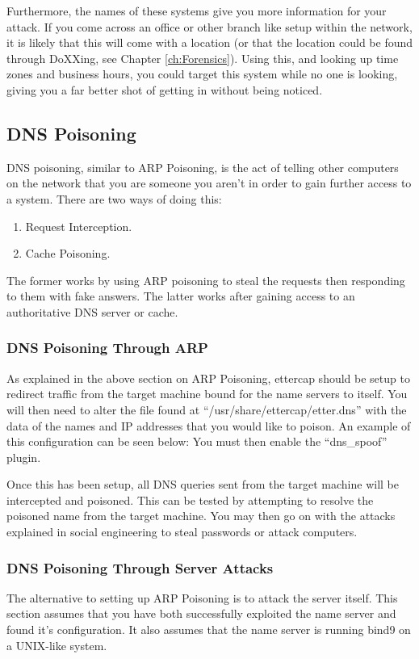 				Furthermore, the names of these systems give you more information for your attack.
				If you come across an office or other branch like setup within the network, it is likely that this will come with a location (or that the location could be found through DoXXing, see Chapter \ref{ch:Forensics}).
				Using this, and looking up time zones and business hours, you could target this system while no one is looking,
				giving you a far better shot of getting in without being noticed.

		\subsection{DNS Poisoning}
			DNS poisoning, similar to ARP Poisoning, is the act of telling other computers on the network that you are someone you aren't in order to gain further access to a system.
			There are two ways of doing this:
			\begin{enumerate}
				\item Request Interception.
				\item Cache Poisoning.
			\end{enumerate}
			The former works by using ARP poisoning to steal the requests then responding to them with fake answers.
			The latter works after gaining access to an authoritative DNS server or cache.

			\subsubsection{DNS Poisoning Through ARP}
				As explained in the above section on ARP Poisoning, ettercap should be setup to redirect traffic from the target machine bound for the name servers to itself.
				You will then need to alter the file found at ``/usr/share/ettercap/etter.dns'' with the data of the names and IP addresses that you would like to poison.
				An example of this configuration can be seen below:
				You must then enable the ``dns\_spoof'' plugin.

				Once this has been setup, all DNS queries sent from the target machine will be intercepted and poisoned.
				This can be tested by attempting to resolve the poisoned name from the target machine.
				You may then go on with the attacks explained in social engineering to steal passwords or attack computers.
			\subsubsection{DNS Poisoning Through Server Attacks}
				The alternative to setting up ARP Poisoning is to attack the server itself.
				This section assumes that you have both successfully exploited the name server and found it's configuration.
				It also assumes that the name server is running bind9 on a UNIX-like system.

